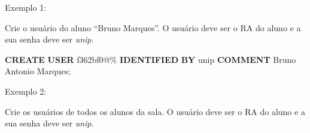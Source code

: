 \documentclass[
]{book}
\newenvironment{Shaded}{\begin{snugshade}}{\end{snugshade}}
\newcommand{\FunctionTok}[1]{\textcolor[rgb]{0.13,0.29,0.53}{\textbf{#1}}}
\newcommand{\KeywordTok}[1]{\textcolor[rgb]{0.13,0.29,0.53}{\textbf{#1}}}
\newcommand{\NormalTok}[1]{#1}
\newcommand{\StringTok}[1]{\textcolor[rgb]{0.31,0.60,0.02}{#1}}
\begin{document}
Exemplo 1:

Crie o usuário do aluno ``Bruno Marques''. O usuário deve ser o RA do aluno e a sua senha deve ser \emph{unip}.

\begin{Shaded}
\begin{Highlighting}[]
\KeywordTok{CREATE} \FunctionTok{USER} \StringTok{\textquotesingle{}f362bf0\textquotesingle{}}\NormalTok{@}\StringTok{\textquotesingle{}\%\textquotesingle{}} \KeywordTok{IDENTIFIED} \KeywordTok{BY} \StringTok{\textquotesingle{}unip\textquotesingle{}} \KeywordTok{COMMENT} \StringTok{\textquotesingle{}Bruno Antonio Marques\textquotesingle{}}\NormalTok{;}
\end{Highlighting}
\end{Shaded}

Exemplo 2:

Crie os usuários de todos os alunos da sala. O usuário deve ser o RA do aluno e a sua senha deve ser \emph{unip}.
\end{document}
